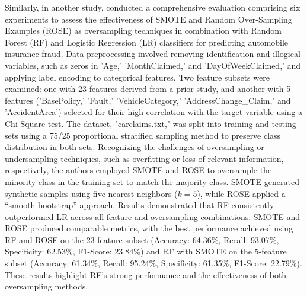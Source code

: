 \documentclass[twoside,11pt]{article}
\begin{document}
Similarly, in another study, \cite{Salmi2022} conducted a comprehensive evaluation comprising six experiments to assess the effectiveness of SMOTE and Random Over-Sampling Examples (ROSE) as oversampling techniques in combination with Random Forest (RF) and Logistic Regression (LR) classifiers for predicting automobile insurance fraud. Data preprocessing involved removing identification and illogical variables, such as zeros in 'Age,' 'MonthClaimed,' and 'DayOfWeekClaimed,' and applying label encoding to categorical features. Two feature subsets were examined: one with 23 features derived from a prior study, and another with 5 features ('BasePolicy,' 'Fault,' 'VehicleCategory,' 'AddressChange\_Claim,' and 'AccidentArea') selected for their high correlation with the target variable using a Chi-Square test. The dataset, "carclaims.txt," was split into training and testing sets using a 75/25 proportional stratified sampling method to preserve class distribution in both sets. Recognizing the challenges of oversampling or undersampling techniques, such as overfitting or loss of relevant information, respectively, the authors employed SMOTE and ROSE to oversample the minority class in the training set to match the majority class. SMOTE generated synthetic samples using five nearest neighbors (\(k = 5\)), while ROSE applied a “smooth bootstrap” approach. Results demonstrated that RF consistently outperformed LR across all feature and oversampling combinations. SMOTE and ROSE produced comparable metrics, with the best performance achieved using RF and ROSE on the 23-feature subset (Accuracy: 64.36\%, Recall: 93.07\%, Specificity: 62.53\%, F1-Score: 23.84\%) and RF with SMOTE on the 5-feature subset (Accuracy: 61.34\%, Recall: 95.24\%, Specificity: 61.35\%, F1-Score: 22.79\%). These results highlight RF's strong performance and the effectiveness of both oversampling methods.
\end{document}
